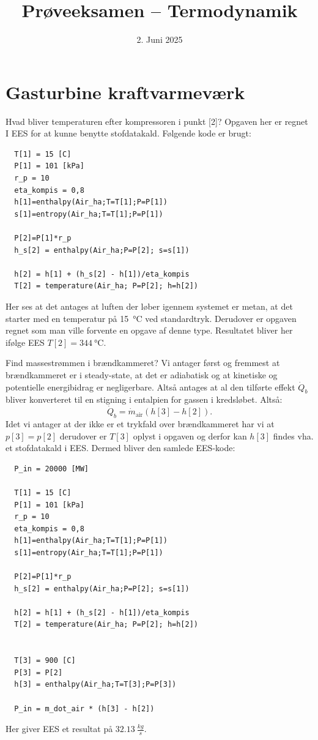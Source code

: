 \documentclass[a4paper]{article}
\title{Prøveeksamen – Termodynamik}
\date{2. Juni 2025}
\begin{document}
\maketitle

\section{Gasturbine kraftvarmeværk} 

 Hvad bliver temperaturen efter kompressoren i punkt [2]?
\bigbreak
Opgaven her er regnet I EES for at kunne benytte stofdatakald. Følgende kode er brugt:

\begin{verbatim}
  T[1] = 15 [C]
  P[1] = 101 [kPa]
  r_p = 10
  eta_kompis = 0,8
  h[1]=enthalpy(Air_ha;T=T[1];P=P[1])
  s[1]=entropy(Air_ha;T=T[1];P=P[1])
   
  P[2]=P[1]*r_p
  h_s[2] = enthalpy(Air_ha;P=P[2]; s=s[1])
   
  h[2] = h[1] + (h_s[2] - h[1])/eta_kompis
  T[2] = temperature(Air_ha; P=P[2]; h=h[2])
\end{verbatim}
Her ses at det antages at luften der løber igennem systemet er metan, at det starter med en temperatur på \qty{15}{\celsius} ved standardtryk. Derudover er opgaven regnet som man ville forvente en opgave af denne type. Resultatet bliver her ifølge EES $T[2] = \qty{344}{\celsius}$.

 Find massestrømmen i brændkammeret?
\bigbreak
Vi antager først og fremmest at brændkammeret er i steady-state, at det er adiabatisk og at kinetiske og potentielle energibidrag er negligerbare. Altså antages at al den tilførte effekt $\dot{Q}_b$ bliver konverteret til en stigning i entalpien for gassen i kredsløbet. Altså:
\[ 
  \dot{Q}_b = \dot{m}_{\mathrm{air}} \left( h[3] - h[2] \right)
.\]
Idet vi antager at der ikke er et trykfald over brændkammeret har vi at $p[3] = p[2]$ derudover er $T[3]$ oplyst i opgaven og derfor kan $h[3]$ findes vha. et stofdatakald i EES. Dermed bliver den samlede EES-kode:

\begin{verbatim}
  P_in = 20000 [MW]
   
  T[1] = 15 [C]
  P[1] = 101 [kPa]
  r_p = 10
  eta_kompis = 0,8
  h[1]=enthalpy(Air_ha;T=T[1];P=P[1])
  s[1]=entropy(Air_ha;T=T[1];P=P[1])
   
  P[2]=P[1]*r_p
  h_s[2] = enthalpy(Air_ha;P=P[2]; s=s[1])
   
  h[2] = h[1] + (h_s[2] - h[1])/eta_kompis
  T[2] = temperature(Air_ha; P=P[2]; h=h[2])
   
   
  T[3] = 900 [C]
  P[3] = P[2]
  h[3] = enthalpy(Air_ha;T=T[3];P=P[3])
   
  P_in = m_dot_air * (h[3] - h[2])
\end{verbatim}
Her giver EES et resultat på $\qty{32,13}{\frac{kg}{s}}$. 
\end{document}
